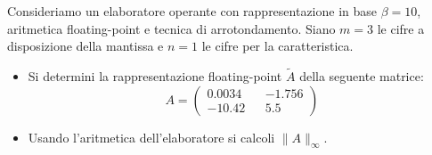 Consideriamo un elaboratore operante con rappresentazione in base
$\beta=10$, aritmetica floating-point e tecnica di
arrotondamento. Siano $m=3$ le cifre a disposizione
della mantissa e $n=1$ le cifre per la caratteristica.\\
\begin{itemize}
\item
\noindent Si determini la rappresentazione floating-point
$\widetilde{A}$ della seguente matrice:
\[
A=\left  (
\begin{array}{ccc}
0.0034 && -1.756 \\
-10.42 && 5.5
\end{array}
\right )
\]

\item
\noindent Usando l'aritmetica dell'elaboratore si calcoli
$\|A\|_\infty$.

\end{itemize}
